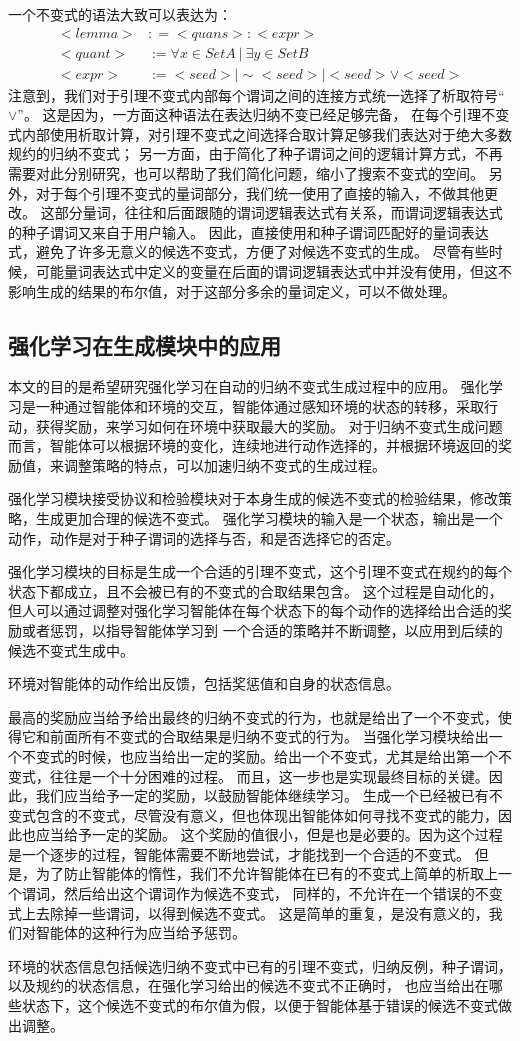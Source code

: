 一个不变式的语法大致可以表达为：
\begin{align}
    <lemma> &: = <quans>:<expr>   \\
    <quant> &:= \forall x  \in SetA  \ |\  \exists y  \in SetB \\
    <expr>  &:= <seed>| \sim<seed> | <seed> \lor <seed> 
\end{align}
注意到，我们对于引理不变式内部每个谓词之间的连接方式统一选择了析取符号“$\lor$”。
这是因为，一方面这种语法在表达归纳不变已经足够完备，
在每个引理不变式内部使用析取计算，对引理不变式之间选择合取计算足够我们表达对于绝大多数规约的归纳不变式；
另一方面，由于简化了种子谓词之间的逻辑计算方式，不再需要对此分别研究，也可以帮助了我们简化问题，缩小了搜索不变式的空间。
另外，对于每个引理不变式的量词部分，我们统一使用了直接的输入，不做其他更改。
这部分量词，往往和后面跟随的谓词逻辑表达式有关系，而谓词逻辑表达式的种子谓词又来自于用户输入。
因此，直接使用和种子谓词匹配好的量词表达式，避免了许多无意义的候选不变式，方便了对候选不变式的生成。
尽管有些时候，可能量词表达式中定义的变量在后面的谓词逻辑表达式中并没有使用，但这不影响生成的结果的布尔值，对于这部分多余的量词定义，可以不做处理。


\subsection{强化学习在生成模块中的应用}

本文的目的是希望研究强化学习在自动的归纳不变式生成过程中的应用。
强化学习是一种通过智能体和环境的交互，智能体通过感知环境的状态的转移，采取行动，获得奖励，来学习如何在环境中获取最大的奖励。
对于归纳不变式生成问题而言，智能体可以根据环境的变化，连续地进行动作选择的，并根据环境返回的奖励值，来调整策略的特点，可以加速归纳不变式的生成过程。

强化学习模块接受\TLA 协议和检验模块对于本身生成的候选不变式的检验结果，修改策略，生成更加合理的候选不变式。
强化学习模块的输入是一个状态，输出是一个动作，动作是对于种子谓词的选择与否，和是否选择它的否定。

强化学习模块的目标是生成一个合适的引理不变式，这个引理不变式在规约的每个状态下都成立，且不会被已有的不变式的合取结果包含。
这个过程是自动化的，但人可以通过调整对强化学习智能体在每个状态下的每个动作的选择给出合适的奖励或者惩罚，以指导智能体学习到
一个合适的策略并不断调整，以应用到后续的候选不变式生成中。

环境对智能体的动作给出反馈，包括奖惩值和自身的状态信息。

最高的奖励应当给予给出最终的归纳不变式的行为，也就是给出了一个不变式，使得它和前面所有不变式的合取结果是归纳不变式的行为。
当强化学习模块给出一个不变式的时候，也应当给出一定的奖励。给出一个不变式，尤其是给出第一个不变式，往往是一个十分困难的过程。
而且，这一步也是实现最终目标的关键。因此，我们应当给予一定的奖励，以鼓励智能体继续学习。
生成一个已经被已有不变式包含的不变式，尽管没有意义，但也体现出智能体如何寻找不变式的能力，因此也应当给予一定的奖励。
这个奖励的值很小，但是也是必要的。因为这个过程是一个逐步的过程，智能体需要不断地尝试，才能找到一个合适的不变式。
但是，为了防止智能体的惰性，我们不允许智能体在已有的不变式上简单的析取上一个谓词，然后给出这个谓词作为候选不变式，
同样的，不允许在一个错误的不变式上去除掉一些谓词，以得到候选不变式。
这是简单的重复，是没有意义的，我们对智能体的这种行为应当给予惩罚。

环境的状态信息包括候选归纳不变式中已有的引理不变式，归纳反例，种子谓词，以及规约的状态信息，在强化学习给出的候选不变式不正确时，
也应当给出在哪些状态下，这个候选不变式的布尔值为假，以便于智能体基于错误的候选不变式做出调整。
